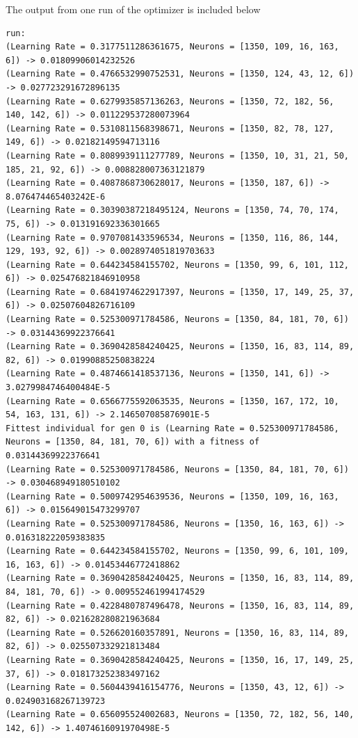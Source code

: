 \documentclass{report}
\begin{document}
The output from one run of the optimizer is included below
\begin{verbatim}
run:
(Learning Rate = 0.3177511286361675, Neurons = [1350, 109, 16, 163, 6]) -> 0.01809906014232526
(Learning Rate = 0.4766532990752531, Neurons = [1350, 124, 43, 12, 6]) -> 0.027723291672896135
(Learning Rate = 0.6279935857136263, Neurons = [1350, 72, 182, 56, 140, 142, 6]) -> 0.011229537280073964
(Learning Rate = 0.5310811568398671, Neurons = [1350, 82, 78, 127, 149, 6]) -> 0.02182149594713116
(Learning Rate = 0.8089939111277789, Neurons = [1350, 10, 31, 21, 50, 185, 21, 92, 6]) -> 0.008828007363121879
(Learning Rate = 0.4087868730628017, Neurons = [1350, 187, 6]) -> 8.076474465403242E-6
(Learning Rate = 0.30390387218495124, Neurons = [1350, 74, 70, 174, 75, 6]) -> 0.013191692336301665
(Learning Rate = 0.9707081433596534, Neurons = [1350, 116, 86, 144, 129, 193, 92, 6]) -> 0.0028974051819703633
(Learning Rate = 0.644234584155702, Neurons = [1350, 99, 6, 101, 112, 6]) -> 0.025476821846910958
(Learning Rate = 0.6841974622917397, Neurons = [1350, 17, 149, 25, 37, 6]) -> 0.02507604826716109
(Learning Rate = 0.525300971784586, Neurons = [1350, 84, 181, 70, 6]) -> 0.03144369922376641
(Learning Rate = 0.3690428584240425, Neurons = [1350, 16, 83, 114, 89, 82, 6]) -> 0.01990885250838224
(Learning Rate = 0.4874661418537136, Neurons = [1350, 141, 6]) -> 3.0279984746400484E-5
(Learning Rate = 0.6566775592063535, Neurons = [1350, 167, 172, 10, 54, 163, 131, 6]) -> 2.146507085876901E-5
Fittest individual for gen 0 is (Learning Rate = 0.525300971784586, Neurons = [1350, 84, 181, 70, 6]) with a fitness of 0.03144369922376641
(Learning Rate = 0.525300971784586, Neurons = [1350, 84, 181, 70, 6]) -> 0.030468949180510102
(Learning Rate = 0.5009742954639536, Neurons = [1350, 109, 16, 163, 6]) -> 0.015649015473299707
(Learning Rate = 0.525300971784586, Neurons = [1350, 16, 163, 6]) -> 0.016318222059383835
(Learning Rate = 0.644234584155702, Neurons = [1350, 99, 6, 101, 109, 16, 163, 6]) -> 0.01453446772418862
(Learning Rate = 0.3690428584240425, Neurons = [1350, 16, 83, 114, 89, 84, 181, 70, 6]) -> 0.009552461994174529
(Learning Rate = 0.4228480787496478, Neurons = [1350, 16, 83, 114, 89, 82, 6]) -> 0.021628280821963684
(Learning Rate = 0.526620160357891, Neurons = [1350, 16, 83, 114, 89, 82, 6]) -> 0.025507332921813484
(Learning Rate = 0.3690428584240425, Neurons = [1350, 16, 17, 149, 25, 37, 6]) -> 0.018173252383497162
(Learning Rate = 0.5604439416154776, Neurons = [1350, 43, 12, 6]) -> 0.024903168267139723
(Learning Rate = 0.656095524002683, Neurons = [1350, 72, 182, 56, 140, 142, 6]) -> 1.4074616091970498E-5

\end{verbatim}
\end{document}
